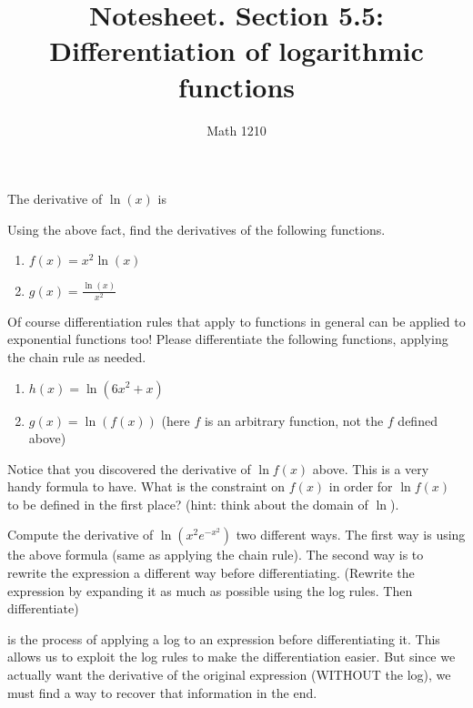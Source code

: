 \documentclass[12pt, a4paper]{article}
\author{Math 1210}
\title{Notesheet. Section 5.5: Differentiation of logarithmic functions}
\date{}
\begin{document}
\maketitle
\nameline
\begin{thrm}
	The derivative of $\ln(x)$ is
\end{thrm}
\vspace{-0.8in}
\begin{ex}
Using the above fact, find the derivatives of the following functions.
  \begin{enumerate}
    \item $f(x) = x^2 \ln(x)$
    \item $g(x) = \frac{\ln(x)}{x^2}$
  \end{enumerate}
\end{ex}
\begin{ex}
  Of course differentiation rules that apply to functions in general can be applied to exponential functions too!  Please differentiate the following functions, applying the chain rule as needed.
  \begin{enumerate}
    \item $h(x) = \ln(6x^2 + x)$
    \item $g(x) = \ln(f(x))$ (here $f$ is an arbitrary function, not the $f$ defined above)
  \end{enumerate}
\end{ex}
\pagebreak
\begin{ex}
  Notice that you discovered the derivative of $\ln f(x)$ above.  This is a very handy formula to have.  What is the constraint on $f(x)$ in order for $\ln f(x)$ to be defined in the first place?  (hint: think about the domain of $\ln$).
\end{ex}
\vspace{-2.3in}
\begin{ex}
	Compute the derivative of $\ln(x^2 e^{-x^2})$ two different ways.  The first way is using the above formula (same as applying the chain rule).  The second way is to rewrite the expression a different way before differentiating.  (Rewrite the expression by expanding it as much as possible using the log rules.  Then differentiate)
\end{ex}
\begin{defi}
	 is the process of applying a log to an expression before differentiating it.  This allows us to exploit the log rules to make the differentiation easier.  But since we actually want the derivative of the original expression (WITHOUT the log), we must find a way to recover that information in the end.
\end{defi}
\end{document}
